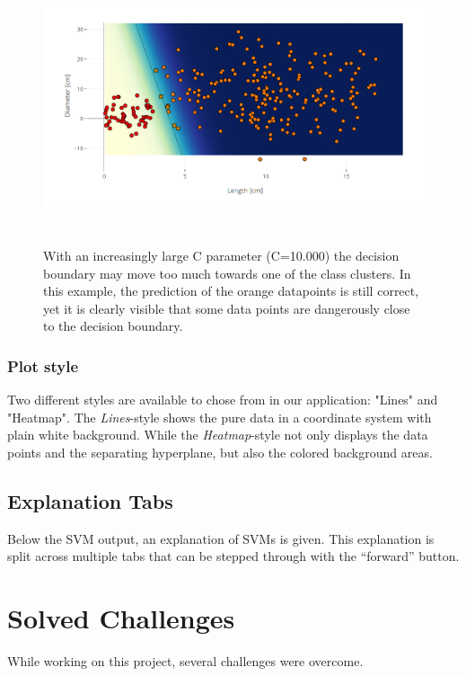 \documentclass{scrartcl}
\begin{document}
\begin{figure}
	\centering
	\includegraphics[height=8cm]{SalmonLin75_10k}
	\caption{With an increasingly large C parameter (C=10.000) the decision boundary may move too much towards one of the class clusters. In this example, the prediction of the orange datapoints is still correct, yet it is clearly visible that some data points are dangerously close to the decision boundary.}%
	\label{fig:largec}%
\end{figure}

\subsubsection*{Plot style}
Two different styles are available to chose from in our application: "Lines" and "Heatmap". The \textit{Lines}-style shows the pure data in a coordinate system with plain white background. While the \textit{Heatmap}-style not only displays the data points and the separating hyperplane, but also the colored background areas.

\subsection{Explanation Tabs}

Below the SVM output, an explanation of SVMs is given.
This explanation is split across multiple tabs
that can be stepped through with the “forward” button.

\newpage
\section{Solved Challenges}

While working on this project, several challenges were overcome.
\end{document}

